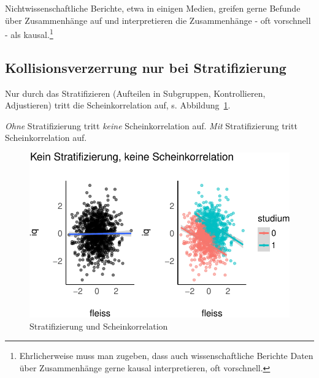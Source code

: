 \documentclass[
  a4paper,
  DIV=11]{scrreprt}
\theoremstyle{definition}
\theoremstyle{remark}
\begin{document}
Nichtwissenschaftliche Berichte, etwa in einigen Medien, greifen gerne
Befunde über Zusammenhänge auf und interpretieren die Zusammenhänge -
oft vorschnell - als kausal.\footnote{Ehrlicherweise muss man zugeben,
  dass auch wissenschaftliche Berichte Daten über Zusammenhänge gerne
  kausal interpretieren, oft vorschnell.}

\hypertarget{kollisionsverzerrung-nur-bei-stratifizierung}{%
\subsection{Kollisionsverzerrung nur bei
Stratifizierung}\label{kollisionsverzerrung-nur-bei-stratifizierung}}

Nur durch das Stratifizieren (Aufteilen in Subgruppen, Kontrollieren,
Adjustieren) tritt die Scheinkorrelation auf, s.
Abbildung~\ref{fig-eignung-strat}.

\begin{tcolorbox}[enhanced jigsaw, left=2mm, colframe=quarto-callout-note-color-frame, opacityback=0, arc=.35mm, rightrule=.15mm, breakable, toptitle=1mm, colbacktitle=quarto-callout-note-color!10!white, colback=white, coltitle=black, bottomrule=.15mm, titlerule=0mm, opacitybacktitle=0.6, bottomtitle=1mm, title=\textcolor{quarto-callout-note-color}{\faInfo}\hspace{0.5em}{Hinweis}, toprule=.15mm, leftrule=.75mm]
\emph{Ohne} Stratifizierung tritt \emph{keine} Scheinkorrelation auf.
\emph{Mit} Stratifizierung tritt Scheinkorrelation auf.
\end{tcolorbox}

\begin{figure}

{\centering \includegraphics{./kausal_files/figure-pdf/fig-eignung-strat-1.pdf}

}

\caption{\label{fig-eignung-strat}Stratifizierung und Scheinkorrelation}

\end{figure}
\end{document}
